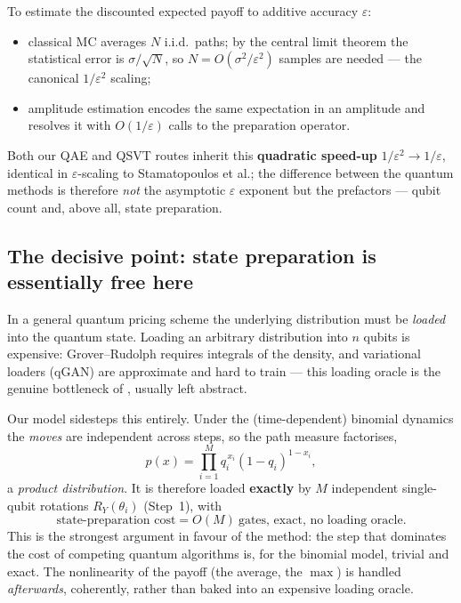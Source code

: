 \documentclass{article}
\begin{document}
To estimate the discounted expected payoff to additive accuracy $\varepsilon$:
\begin{itemize}
    \item classical MC averages $N$ i.i.d.\ paths; by the central limit theorem the statistical error is $\sigma/\sqrt N$, so $N=O(\sigma^2/\varepsilon^2)$ samples are needed --- the canonical $1/\varepsilon^2$ scaling;
    \item amplitude estimation \cite{montanaro2015quantum} encodes the same expectation in an amplitude and resolves it with $O(1/\varepsilon)$ calls to the preparation operator.
\end{itemize}
Both our QAE and QSVT routes inherit this \textbf{quadratic speed-up} $1/\varepsilon^2 \to 1/\varepsilon$, identical in $\varepsilon$-scaling to Stamatopoulos et al.; the difference between the quantum methods is therefore \emph{not} the asymptotic $\varepsilon$ exponent but the prefactors --- qubit count and, above all, state preparation.

\subsection{The decisive point: state preparation is essentially free here}

In a general quantum pricing scheme the underlying distribution must be \emph{loaded} into the quantum state. Loading an arbitrary distribution into $n$ qubits is expensive: Grover--Rudolph requires integrals of the density, and variational loaders (qGAN) are approximate and hard to train --- this loading oracle is the genuine bottleneck of \cite{Stamatopoulos_2020}, usually left abstract.

Our model sidesteps this entirely. Under the (time-dependent) binomial dynamics the \emph{moves} are independent across steps, so the path measure factorises,
\begin{equation}
p(x) = \prod_{i=1}^{M} q_i^{\,x_i}(1-q_i)^{1-x_i},
\end{equation}
a \emph{product distribution}. It is therefore loaded \textbf{exactly} by $M$ independent single-qubit rotations $R_Y(\theta_i)$ (Step~1), with
\begin{equation}
\boxed{\;\text{state-preparation cost} = O(M)\ \text{gates, exact, no loading oracle.}\;}
\end{equation}
This is the strongest argument in favour of the method: the step that dominates the cost of competing quantum algorithms is, for the binomial model, trivial and exact. The nonlinearity of the payoff (the average, the $\max$) is handled \emph{afterwards}, coherently, rather than baked into an expensive loading oracle.
\end{document}
